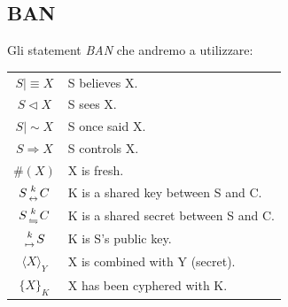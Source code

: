 \documentclass[a4paper,titlepage]{article}
\begin{document}
\subsection{BAN}
Gli statement \textit{BAN} che andremo a utilizzare:
\begin{center}
\begin{tabular}{|c | l|} \hline
$ S \mid \equiv X  $ & S believes X.\\
$ S \lhd X  $ & S sees X.\\
$ S \mid \sim X  $ & S once said X.\\
$ S \Rightarrow X $ & S controls X.\\ 
$ \#(X) $ & X is fresh.\\
$S {k \atop \leftrightarrow} C $ & K is a shared key between S and C.\\ 
$S {k \atop \leftrightharpoons} C $ & K is a shared secret between S and C.\\ 
${k  \atop \mapsto} S $ & K is S's public key.\\
$\langle X \rangle_{Y}$ & X is combined with Y (secret).\\
$\{X\}_{K}$ & X has been cyphered with K.\\ \hline
\end{tabular}
\end{center}
\fi
\end{document}
